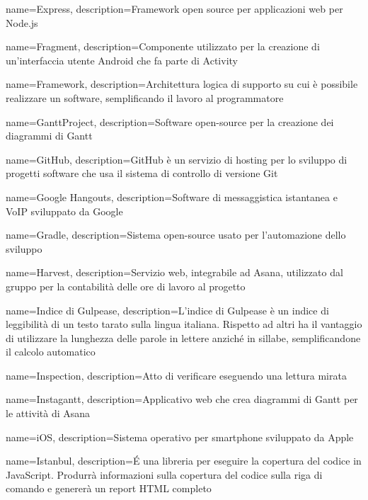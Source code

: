 {
	name={Express},
	description={Framework open source per applicazioni web per Node.js}
	{\newpage}
}

{
	name={Fragment},
	description={Componente utilizzato per la creazione di un'interfaccia utente Android che fa parte di Activity}
}

{
	name={Framework},
	description={Architettura logica di supporto su cui è possibile realizzare un software, semplificando il lavoro al programmatore}
	{\newpage}
}

{
	name={GanttProject},
	description={Software open-source per la creazione dei diagrammi di Gantt}
}

{
	name={GitHub},
	description={GitHub è un servizio di hosting per lo sviluppo di progetti software che usa il sistema di controllo di versione Git}
}

{
	name={Google Hangouts},
	description={Software di messaggistica istantanea e VoIP sviluppato da Google}
}

{
	name={Gradle},
	description={Sistema open-source usato per l'automazione dello sviluppo}
	{\newpage}
}

{
	name={Harvest},
	description={Servizio web, integrabile ad Asana, utilizzato dal gruppo per la contabilità delle ore di lavoro al progetto}
	{\newpage}
}

{
	name={Indice di Gulpease},
	description={L’indice di Gulpease è un indice di leggibilità di un testo tarato sulla lingua
		italiana. Rispetto ad altri ha il vantaggio di utilizzare la lunghezza delle parole in lettere anziché in sillabe, semplificandone il calcolo automatico}
}

{
	name={Inspection},
	description={Atto di verificare eseguendo una lettura mirata}
}

{
	name={Instagantt},
	description={Applicativo web che crea diagrammi di Gantt per le attività di Asana}
}

{
	name={iOS},
	description={Sistema operativo per smartphone sviluppato da Apple}
}

{
	name={Istanbul},
	description={É una libreria per eseguire la copertura del codice in JavaScript. Produrrà informazioni sulla copertura del codice sulla riga di comando e genererà un report HTML completo}
	{\newpage}
}

